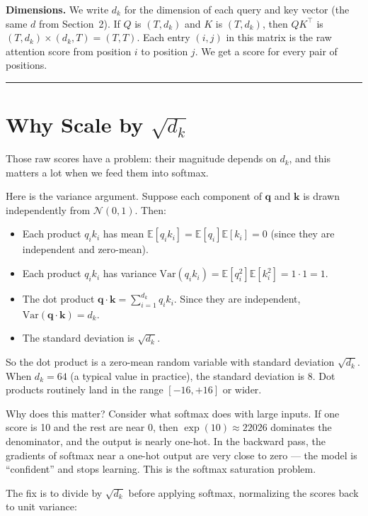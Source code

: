 \textbf{Dimensions.} We write $d_k$ for the dimension of each query and key vector (the same $d$ from Section~2). If $Q$ is $(T, d_k)$ and $K$ is $(T, d_k)$, then $QK^\top$ is $(T, d_k) \times (d_k, T) = (T, T)$. Each entry $(i, j)$ in this matrix is the raw attention score from position $i$ to position $j$. We get a score for every pair of positions.

\bigskip\hrule\bigskip

\section{Why Scale by $\sqrt{d_k}$}

Those raw scores have a problem: their magnitude depends on $d_k$, and this matters a lot when we feed them into softmax.

Here is the variance argument. Suppose each component of $\mathbf{q}$ and $\mathbf{k}$ is drawn independently from $\mathcal{N}(0, 1)$. Then:

\begin{itemize}
  \item Each product $q_i k_i$ has mean $\mathbb{E}[q_i k_i] = \mathbb{E}[q_i]\mathbb{E}[k_i] = 0$ (since they are independent and zero-mean).
  \item Each product $q_i k_i$ has variance $\mathrm{Var}(q_i k_i) = \mathbb{E}[q_i^2]\mathbb{E}[k_i^2] = 1 \cdot 1 = 1$.
  \item The dot product $\mathbf{q} \cdot \mathbf{k} = \sum_{i=1}^{d_k} q_i k_i$. Since they are independent, $\mathrm{Var}(\mathbf{q} \cdot \mathbf{k}) = d_k$.
  \item The standard deviation is $\sqrt{d_k}$.
\end{itemize}

So the dot product is a zero-mean random variable with standard deviation $\sqrt{d_k}$. When $d_k = 64$ (a typical value in practice), the standard deviation is 8. Dot products routinely land in the range $[-16, +16]$ or wider.

Why does this matter? Consider what softmax does with large inputs. If one score is 10 and the rest are near 0, then $\exp(10) \approx 22026$ dominates the denominator, and the output is nearly one-hot. In the backward pass, the gradients of softmax near a one-hot output are very close to zero --- the model is ``confident'' and stops learning. This is the softmax saturation problem.

The fix is to divide by $\sqrt{d_k}$ before applying softmax, normalizing the scores back to unit variance:

